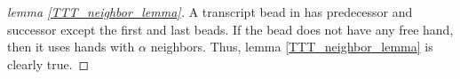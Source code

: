 \documentclass[runningheads]{llncs}
\begin{document}
%      
%      
%
%






\begin{proof}[lemma \ref{TTT_neighbor_lemma}]
A transcript bead in has predecessor and successor except the first and last beads. If the bead does not have any free hand, then it uses hands with $\alpha$ neighbors. Thus, lemma \ref{TTT_neighbor_lemma} is clearly true.
\end{proof}
\end{document}
